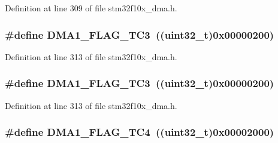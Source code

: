 Definition at line 309 of file stm32f10x\+\_\+dma.\+h.

\subsubsection[{\texorpdfstring{D\+M\+A1\+\_\+\+F\+L\+A\+G\+\_\+\+T\+C3}{DMA1_FLAG_TC3}}]{\setlength{\rightskip}{0pt plus 5cm}\#define D\+M\+A1\+\_\+\+F\+L\+A\+G\+\_\+\+T\+C3~(({\bf uint32\+\_\+t})0x00000200)}\hypertarget{group___d_m_a__flags__definition_ga0490d6c6fca12f4bcc61ef69e3fbdd93}{}\label{group___d_m_a__flags__definition_ga0490d6c6fca12f4bcc61ef69e3fbdd93}


Definition at line 313 of file stm32f10x\+\_\+dma.\+h.

\subsubsection[{\texorpdfstring{D\+M\+A1\+\_\+\+F\+L\+A\+G\+\_\+\+T\+C3}{DMA1_FLAG_TC3}}]{\setlength{\rightskip}{0pt plus 5cm}\#define D\+M\+A1\+\_\+\+F\+L\+A\+G\+\_\+\+T\+C3~(({\bf uint32\+\_\+t})0x00000200)}\hypertarget{group___d_m_a__flags__definition_ga0490d6c6fca12f4bcc61ef69e3fbdd93}{}\label{group___d_m_a__flags__definition_ga0490d6c6fca12f4bcc61ef69e3fbdd93}


Definition at line 313 of file stm32f10x\+\_\+dma.\+h.

\subsubsection[{\texorpdfstring{D\+M\+A1\+\_\+\+F\+L\+A\+G\+\_\+\+T\+C4}{DMA1_FLAG_TC4}}]{\setlength{\rightskip}{0pt plus 5cm}\#define D\+M\+A1\+\_\+\+F\+L\+A\+G\+\_\+\+T\+C4~(({\bf uint32\+\_\+t})0x00002000)}\hypertarget{group___d_m_a__flags__definition_ga78f2798eca161493d5dc6058f65b0f17}{}\label{group___d_m_a__flags__definition_ga78f2798eca161493d5dc6058f65b0f17}


